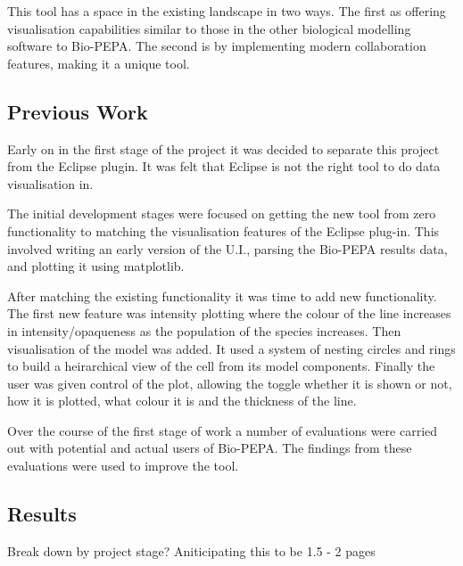 This tool has a space in the existing landscape in two ways.  The first as offering visualisation capabilities similar to those in the other biological modelling software to Bio-PEPA.  The second is by implementing modern collaboration features, making it a unique tool.

\subsection{Previous Work}

Early on in the first stage of the project it was decided to separate this project from the Eclipse plugin.  It was felt that Eclipse is not the right tool to do data visualisation in.

The initial development stages were focused on getting the new tool from zero functionality to matching the visualisation features of the Eclipse plug-in.  This involved writing an early version of the U.I., parsing the Bio-PEPA results data, and plotting it using matplotlib.

After matching the existing functionality it was time to add new functionality.
The first new feature was intensity plotting where the colour of the line increases in intensity/opaqueness as the population of the species increases.  Then visualisation of the model was added.  It used a system of nesting circles and rings to build a heirarchical view of the cell from its model components.  Finally the user was given control of the plot, allowing the toggle whether it is shown or not, how it is plotted, what colour it is and the thickness of the line.

Over the course of the first stage of work a number of evaluations were carried out with potential and actual users of Bio-PEPA.  The findings from these evaluations were used to improve the tool.

\subsection{Results}

Break down by project stage?  Aniticipating this to be 1.5 - 2 pages

